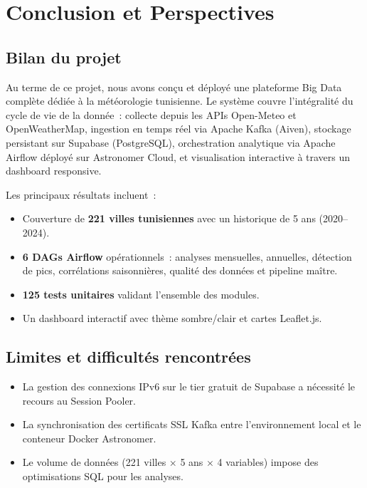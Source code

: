 \documentclass[a4paper,12pt,oneside]{report}
\begin{document}
\chapter*{Conclusion et Perspectives}

\section*{Bilan du projet}
Au terme de ce projet, nous avons conçu et déployé une plateforme Big Data complète dédiée à la météorologie tunisienne. Le système couvre l'intégralité du cycle de vie de la donnée~: collecte depuis les APIs Open-Meteo et OpenWeatherMap, ingestion en temps réel via Apache Kafka (Aiven), stockage persistant sur Supabase (PostgreSQL), orchestration analytique via Apache Airflow déployé sur Astronomer Cloud, et visualisation interactive à travers un dashboard responsive.

Les principaux résultats incluent~:
\begin{itemize}
  \item Couverture de \textbf{221 villes tunisiennes} avec un historique de 5 ans (2020--2024).
  \item \textbf{6 DAGs Airflow} opérationnels~: analyses mensuelles, annuelles, détection de pics, corrélations saisonnières, qualité des données et pipeline maître.
  \item \textbf{125 tests unitaires} validant l'ensemble des modules.
  \item Un dashboard interactif avec thème sombre/clair et cartes Leaflet.js.
\end{itemize}

\section*{Limites et difficultés rencontrées}
\begin{itemize}
  \item La gestion des connexions IPv6 sur le tier gratuit de Supabase a nécessité le recours au Session Pooler.
  \item La synchronisation des certificats SSL Kafka entre l'environnement local et le conteneur Docker Astronomer.
  \item Le volume de données (221 villes $\times$ 5 ans $\times$ 4 variables) impose des optimisations SQL pour les analyses.
\end{itemize}
\end{document}
